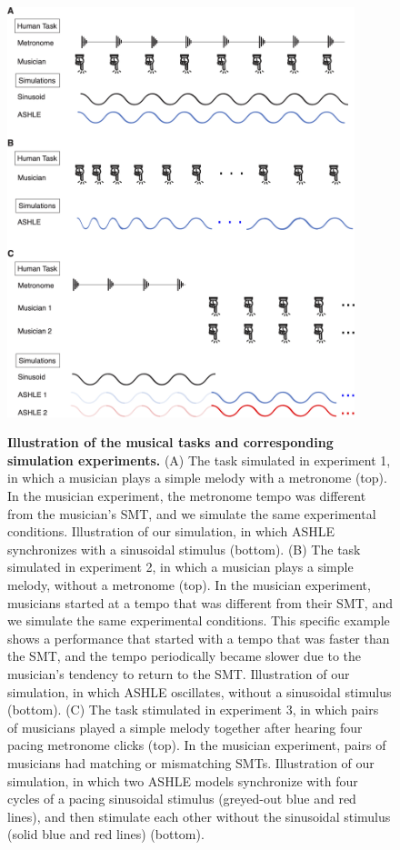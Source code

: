 \documentclass{report}
\begin{document}
\begin{figure}
    \centering
    \includegraphics[width=0.9\textwidth]{figures/fig3_1.png}
    \label{f3_1}
\end{figure}
\begin{figure}[t]
    \caption[Illustration of the musical tasks and corresponding simulation experiments]{\textbf{Illustration of the musical tasks and corresponding simulation experiments.} (A) The task simulated in experiment 1, in which a musician plays a simple melody with a metronome (top). In the musician experiment, the metronome tempo was different from the musician’s SMT, and we simulate the same experimental conditions. Illustration of our simulation, in which ASHLE synchronizes with a sinusoidal stimulus (bottom). (B) The task simulated in experiment 2, in which a musician plays a simple melody, without a metronome (top). In the musician experiment, musicians started at a tempo that was different from their SMT, and we simulate the same experimental conditions. This specific example shows a performance that started with a tempo that was faster than the SMT, and the tempo periodically became slower due to the musician’s tendency to return to the SMT. Illustration of our simulation, in which ASHLE oscillates, without a sinusoidal stimulus (bottom). (C) The task stimulated in experiment 3, in which pairs of musicians played a simple melody together after hearing four pacing metronome clicks (top). In the musician experiment, pairs of musicians had matching or mismatching SMTs. Illustration of our simulation, in which two ASHLE models synchronize with four cycles of a pacing sinusoidal stimulus (greyed-out blue and red lines), and then stimulate each other without the sinusoidal stimulus (solid blue and red lines) (bottom).} 
\end{figure}
\end{document}
